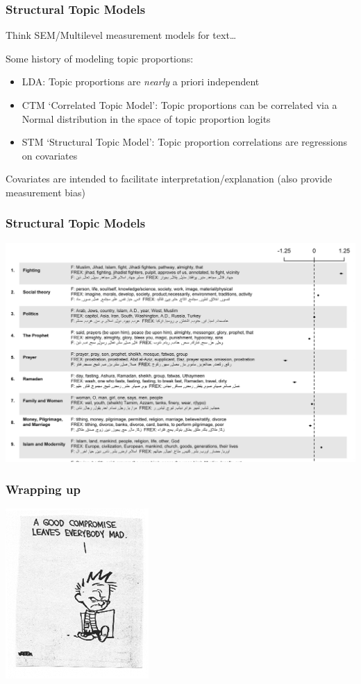 \documentclass[11pt,compress,professionalfonts]{beamer}
\newcommand{\ita}{\begin{itemize}}
\newcommand{\itm}{\item[]}
\newcommand{\itz}{\end{itemize}}
\begin{document}
\begin{frame}[t]\frametitle{Structural Topic Models}

Think SEM/Multilevel measurement models for text\ldots

Some history of modeling topic proportions:
\ita
\itm LDA: Topic proportions are \textit{nearly} a priori independent
\itm CTM `Correlated Topic Model': Topic proportions can be correlated via a Normal distribution in the space of topic proportion logits
\itm STM `Structural Topic Model': Topic proportion correlations are regressions on covariates
\itz

Covariates are intended to facilitate interpretation/explanation (also provide measurement bias)

\end{frame}
\begin{frame}[t]\frametitle{Structural Topic Models}

\centerline{\includegraphics[scale=.8]{pictures/stm-clerics}}

\end{frame}
\begin{frame}[t]\frametitle{Wrapping up}

\centerline{\includegraphics[scale=1.5]{pictures/compromise.png}}


\end{frame}
\end{document}
